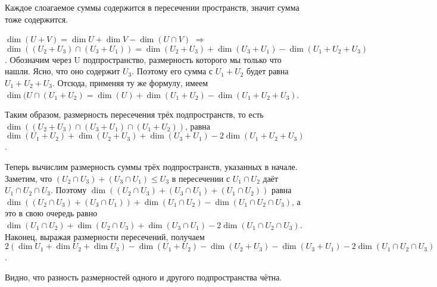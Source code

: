 \documentclass[12pt]{article}
\newenvironment{solutions}[2][Solutions]
{\begin{trivlist}\item[{\bfseries #1} {\bfseries #2.}]}{\end{trivlist}}
\begin{document}
\begin{solutions}{2} 
Каждое слоагаемое суммы содержится в пересечении пространств, значит сумма тоже содержится.

$\dim(U+V) = \dim U+\dim V-\dim(U\cap V)$ $\Rightarrow$ $\dim((U_2+U_3)\cap (U_3+U_1)) = \dim(U_2+U_3)+\dim(U_3+U_1)-\dim(U_1+U_2+U_3)$. Обозначим через U подпространство, размерность которого мы только что нашли. Ясно, что оно содержит $U_3$. Поэтому его сумма с $U_1+U_2$ будет равна $U_1+U_2+U_3$. Отсюда, применяя ту же формулу, имеем $\dim(U\cap (U_1+U_2)=\dim(U)+\dim(U_1+U_2)-\dim(U_1+U_2+U_3)$.

Таким образом, размерность пересечения трёх подпространств, то есть $\dim((U_2+U_3)\cap(U_3+U_1)\cap(U_1+U_2))$, равна $\dim(U_1+U_2)+\dim(U_2+U_3)+\dim(U_3+U_1)-2\dim(U_1+U_2+U_3)$.

Теперь вычислим размерность суммы трёх подпространств, указанных в начале. Заметим, что $(U_2\cap U_3)+(U_3\cap U_1)\leqslant U_3$ в пересечении с $U_1\cap U_2$ даёт $U_1\cap U_2\cap U_3$. Поэтому $\dim((U_2\cap U_3)+(U_3\cap U_1)+(U_1\cap U_2))$ равна $\dim((U_2\cap U_3)+(U_3\cap U_1))+\dim(U_1\cap U_2)-\dim(U_1\cap U_2\cap U_3)$, а это в свою очередь равно $\dim(U_1\cap U_2)+\dim(U_2\cap U_3)+\dim(U_3\cap U_1)-2\dim(U_1\cap U_2\cap U_3)$. Наконец, выражая размерности пересечений, получаем $2(\dim U_1+\dim U_2+\dim U_3)-\dim(U_1+U_2)-\dim(U_2+U_3)-\dim(U_3+U_1)-2\dim(U_1\cap U_2\cap U_3)$.

Видно, что разность размерностей одного и другого подпространства чётна.
\end{solutions}
\end{document}
